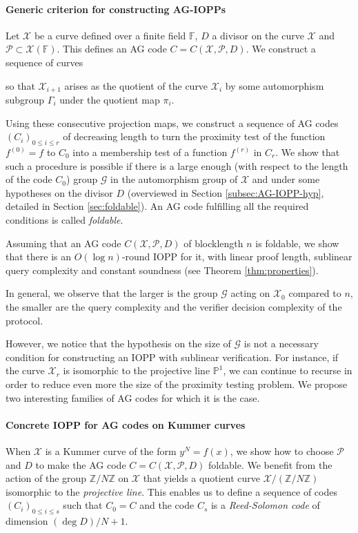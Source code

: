 \documentclass[10pt,a4paper]{article}
\newcommand\F{\mathbb{F}}
\newcommand\PP{\mathbb{P}}
\newcommand\Z{\mathbb{Z}}
\newcommand\calX{\mathcal{X}}
\newcommand\calP{\mathcal{P}}
\newcommand\calG{\mathcal{G}}
\newcommand\mydef{\coloneqq}
\theoremstyle{plain}
\theoremstyle{plain}
\theoremstyle{definition}
\theoremstyle{remark}
\theoremstyle{plain}
\begin{document}
\paragraph*{Generic criterion for constructing AG-IOPPs}
Let $\calX$ be a curve defined over a finite field $\F$, $D$ a divisor on the curve $\calX$ and $\calP \subset \calX(\F)$. This defines an AG code $C=C(\calX, \calP, D)$. We construct a sequence of curves
\begin{center}
\end{center}
so that $\calX_{i+1}$ arises as the quotient of the curve $\calX_i$ by some automorphism subgroup $\Gamma_i$ under the quotient map $\pi_i$. 

Using these consecutive projection maps, we construct a sequence of AG codes $(C_i)_{0 \le i \le r}$ of decreasing length to turn the proximity test of the function $f^{(0)}=f$ to $C_0$ into a membership test of a function $f^{(r)}$ in $C_r$. We show that such a procedure is possible if there is a large enough (with respect to the length of the code $C_0$) group $\calG$ in the automorphism group of $\calX$ and under some hypotheses on the divisor $D$ (overviewed in Section \ref{subsec:AG-IOPP-hyp}, detailed in Section \ref{sec:foldable}). An AG code fulfilling all the required conditions is called \emph{foldable}.


Assuming that an AG code $C(\calX, \calP, D)$ of blocklength $n$ is foldable, we show that there is an $O(\log n)$-round IOPP for it, with linear proof length, sublinear query complexity and constant soundness (see Theorem \ref{thm:properties}).


In general, we observe that the larger is the group $\calG$ acting on $\calX_0$ compared to $n$, the smaller are the query complexity and the verifier decision complexity of the protocol. 

However, we notice that the hypothesis on the size of $\calG$ is not a necessary condition for constructing an IOPP with sublinear verification. For instance, if the curve $\calX_r$ is isomorphic to the projective line $\PP^1$, we can continue to recurse in order to reduce even more the size of the proximity testing problem. We propose two interesting families of AG codes for which it is the case.

\paragraph*{Concrete IOPP for AG codes on Kummer curves}
When $\calX$ is a Kummer curve of the form $y^N = f(x)$, we show how to choose $\calP$ and $D$ to make the AG code $C = C(\calX, \calP, D)$ foldable. We benefit from the action of the group $\Z / N \Z$ on $\calX$ that yields a quotient curve $\calX / (\Z/N\Z)$ isomorphic to the \emph{projective line}. This enables us to define a sequence of codes $(C_i)_{0 \le i \le s}$ such that $C_0 = C$ and the code $C_s$ is a \textit{Reed-Solomon code} of dimension $(\deg{D})/N + 1$.
%
\end{document}
